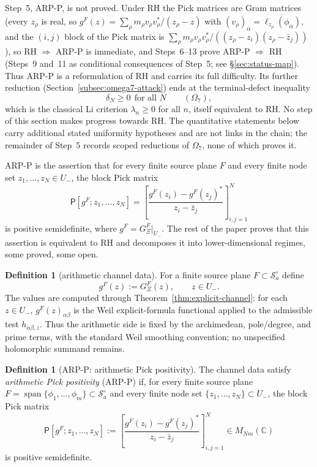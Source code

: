 \documentclass[11pt]{amsart}
\theoremstyle{definition}
\newtheorem{definition}[theorem]{Definition}
\theoremstyle{remark}
\theoremstyle{definition}
\newcommand{\cS}{\mathcal{S}}
\newcommand{\C}{\mathbb{C}}
\newcommand{\GXi}{G_\Xi}
\begin{document}
Step~5, ARP-P, is not proved.  Under RH the Pick matrices are Gram matrices (every $z_\rho$ is real,
so $g^F(z)=\sum_\rho m_\rho v_\rho v_\rho^*/(z_\rho-z)$ with $(v_\rho)_\alpha=\overline{\ell_{z_\rho}(\phi_\alpha)}$,
and the $(i,j)$ block of the Pick matrix is
$\sum_\rho m_\rho v_\rho v_\rho^*/((z_\rho-z_i)(z_\rho-\bar z_j))$), so RH $\Rightarrow$ ARP-P is
immediate, and Steps~6--13 prove ARP-P $\Rightarrow$ RH (Steps~9 and~11 as conditional consequences of
Step~5; see \S\ref{sec:status-map}).  Thus ARP-P is a reformulation of RH and carries its full
difficulty.  Its further reduction (Section~\ref{subsec:omega7-attack}) ends at the terminal-defect
inequality
\[
   \delta_N\ge0\ \ \text{for all }N\qquad(\Omega_7),
\]
which is the classical Li criterion $\lambda_n\ge0$ for all $n$, itself equivalent to RH.  No step of
this section makes progress towards RH.  The quantitative statements below carry additional stated
uniformity hypotheses and are not links in the chain; the remainder of Step~5 records scoped
reductions of $\Omega_7$, none of which proves it.

ARP-P is the assertion that for every finite source plane $F$ and every finite node set
$z_1,\ldots,z_N\in U_-$, the block Pick matrix
\[
   \mathsf P[g^F;z_1,\ldots,z_N]
   =
   \left[
      \frac{g^F(z_i)-g^F(z_j)^*}{z_i-\bar z_j}
   \right]_{i,j=1}^N
\]
is positive semidefinite, where $g^F=\GXi^F|_{U_-}$.  The rest of the paper proves that this
assertion is equivalent to RH and decomposes it into lower-dimensional regimes, some proved, some
open.


\begin{definition}[arithmetic channel data]\label{def:arith-data}
For a finite source plane $F\subset\cS_a^\circ$ define
\[
   g^F(z):=\GXi^F(z),\qquad z\in U_-.
\]
The values are computed through Theorem~\ref{thm:explicit-channel}: for each $z\in U_-$,
$g^F(z)_{\alpha\beta}$ is the Weil explicit-formula functional applied to the admissible test
$h_{\alpha\beta,z}$.  Thus the arithmetic side is fixed by the archimedean, pole/degree, and prime terms,
with the standard Weil smoothing convention; no unspecified holomorphic summand remains.
\end{definition}

\begin{definition}[ARP-P: arithmetic Pick positivity]\label{def:ARP-P}
The channel data satisfy \emph{arithmetic Pick positivity} (ARP-P) if, for every finite source plane
$F=\operatorname{span}\{\phi_1,\ldots,\phi_m\}\subset\cS_a^\circ$ and every finite node set
$\{z_1,\ldots,z_N\}\subset U_-$, the block Pick matrix
\[
   \mathsf P[g^F;z_1,\ldots,z_N]
   :=
   \left[
      \frac{g^F(z_i)-g^F(z_j)^*}{z_i-\bar z_j}
   \right]_{i,j=1}^{N}
   \in M_{Nm}(\C)
\]
is positive semidefinite.
\end{definition}
\end{document}
